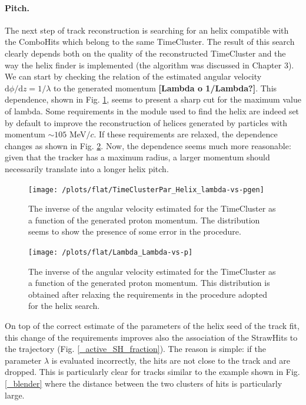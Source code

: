 \documentclass[12pt,a4paper,openright, oneside, titlepage]{book} %
\begin{document}
\paragraph{Pitch.}
The next step of track reconstruction is searching for an helix compatible 
with the ComboHits which belong to the same TimeCluster.
The result of this search clearly depends both on the quality of the reconstructed TimeCluster and the way the helix finder is implemented (the algorithm was discussed in Chapter 3). 
We can start by checking the relation of the estimated angular velocity 
$\mathrm{d}\phi/\mathrm{d}z = 1/ \lambda$ to the generated momentum \textbf{[Lambda o 1/Lambda?]}. 
This dependence, shown in Fig. \ref{_TimeClusterMVA_Lambda-vs-p}, seems to present a sharp cut for the maximum value of lambda.  
Some requirements in the module used to find the helix are indeed set by default to improve the reconstruction of helices generated by particles with momentum $\sim 105$ MeV$/c$. 
If these requirements are relaxed, the dependence changes as shown in Fig. \ref{_Lambda_Lambda-vs-p}. 
Now, the dependence seems much more reasonable: 
given that the tracker has a maximum radius, 
a larger momentum should necessarily translate into a longer helix pitch.

\begin{figure}[h!]
\centering
\texttt{[image: /plots/flat/TimeClusterPar\_Helix\_lambda-vs-pgen]}
\caption[AAA]{The inverse of the angular velocity estimated for the TimeCluster as a function of the generated proton momentum. 
The distribution seems to show the presence of some error in the procedure.}
\label{_TimeClusterMVA_Lambda-vs-p}
\end{figure}

\begin{figure}[h!]
\centering
\texttt{[image: /plots/flat/Lambda\_Lambda-vs-p]}
\caption[AAA]{The inverse of the angular velocity estimated for the TimeCluster as a function of the generated proton momentum.
This distribution is obtained after relaxing the requirements in the procedure adopted for the helix search.}
\label{_Lambda_Lambda-vs-p}
\end{figure}

\noindent On top of the correct estimate of the parameters of the helix seed of the track fit, 
this change of the requirements improves also the association of the StrawHits to the trajectory 
(Fig. \ref{_active_SH_fraction}). 
The reason is simple: 
if the parameter $\lambda$ is evaluated incorrectly, 
the hits are not close to the track and are dropped. 
This is particularly clear for tracks similar to the example shown in Fig. \ref{_blender} 
where the distance between the two clusters of hits is particularly large. 
\end{document}
